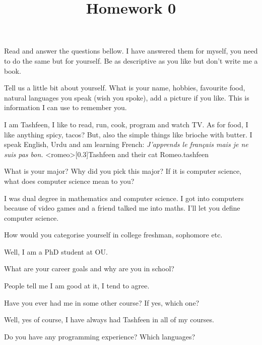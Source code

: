 \documentclass{homework}
\title{Homework 0}
\begin{document}
 \maketitle


Read and answer the questions bellow. I have answered them for myself,
you need to do the same but for yourself. Be as descriptive as you
like but don’t write me a book.

\question Tell us a little bit about yourself. What is your name,
hobbies, favourite food, natural languages you speak (wish you spoke),
add a picture if you like. This is information I can use to remember
you.

\begin{sol}
I am Tashfeen, I like to read, run, cook, program and watch TV. As for
food, I like anything spicy, tacos?  But, also the simple things like
brioche with butter. I speak English, Urdu and am learning French:
\textit{J’apprends le français mais je ne suis pas bon.}
\img<romeo>[0.3]{Tashfeen and their cat Romeo.}{tashfeen}
\end{sol}


\question What is your major? Why did you pick this major? If it is
computer science, what does computer science mean to you?

\begin{sol}
I was dual degree in mathematics and computer science. I got into
computers because of video games and a friend talked me into
maths. I’ll let you define computer science.
\end{sol}

\question How would you categorise yourself in college \eg freshman,
sophomore etc.

\begin{sol}
Well, I am a PhD student at OU.
\end{sol}

\question What are your career goals and why are you in school?

\begin{sol}
People tell me I am good at it, I tend to agree.
\end{sol}

\question Have you ever had me in some other course? If yes, which one?

\begin{sol}
Well, yes of course, I have always had Tashfeen in all of my courses.
\end{sol}

\question Do you have any programming experience? Which languages?
\end{document}
